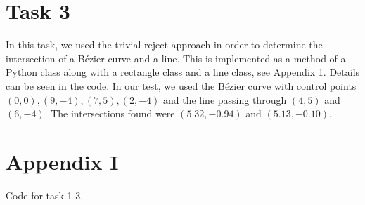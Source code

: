 \documentclass[]{article}
\begin{document}
\section*{Task 3}
In this task, we used the trivial reject approach in order to determine the intersection of a B\'ezier curve and a line. This is implemented as a method of a Python class along with a rectangle class and a line class, see Appendix 1. Details can be seen in the code. In our test, we used the B\'ezier curve with control points $(0, 0), (9, -4), (7, 5), (2, -4)$ and the line passing through $(4, 5)$ and $(6, -4)$. The intersections found were $(5.32, -0.94)$ and $(5.13, -0.10)$.

\newpage
\section*{Appendix I}
Code for task 1-3.

\end{document}
